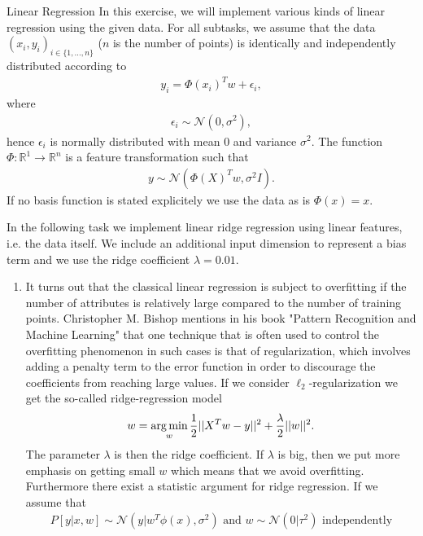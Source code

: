 \begin{task}{Linear Regression}
In this exercise, we will implement various kinds of linear regression using the given data. For all subtasks, we assume that the data $(x_i, y_i)_{i \in \{1, \hdots, n \}}$ ($n$ is the number of points) is identically and independently distributed according to 
\begin{align*}
y_i = \Phi(x_i)^T w + \epsilon_i,
\end{align*}
where
\begin{align*}
\epsilon_i  \sim \mathcal{N} ( 0, \sigma^2 ),
\end{align*}
hence $\epsilon_i$ is normally distributed with mean $0$ and variance $\sigma^2$. The function $\Phi : \mathbb{R}^1 \to \mathbb{R}^n$ is a feature transformation such that
\begin{align*}
y \sim \mathcal{N} ( \Phi(X)^T w, \sigma^2 I).
\end{align*}
If no basis function is stated explicitely we use the data as is $\Phi(x) = x$. 
\begin{subtask}
In the following task we implement linear ridge regression using linear features, i.e. the data itself. We include an additional input dimension to represent a bias term and we use the ridge coefficient $\lambda = 0.01$.
\begin{enumerate}
\item It turns out that the classical linear regression is subject to overfitting if the number of attributes is relatively large compared to the number of training points. Christopher M. Bishop mentions in his book "Pattern Recognition and Machine Learning" that one technique that is often used to control the overfitting phenomenon in such cases is that of regularization, which involves adding a penalty term to the error function in order to discourage the coefficients from reaching large values. If we consider $\ell_2$-regularization we get the so-called ridge-regression model
\begin{align*}
w = \operatorname*{arg\,min}_{w} \frac{1}{2} ||X^Tw - y||^2 + \frac{\lambda}{2} ||w||^2.
\end{align*}
The parameter $\lambda$ is then the ridge coefficient. If $\lambda$ is big, then we put more emphasis on getting small $w$ which means that we avoid overfitting. \\
Furthermore there exist a statistic argument for ridge regression. If we assume that 
\begin{align*}
P[y|x,w] \sim \mathcal{N}(y | w^T \phi(x), \sigma^2) \text{ and } w \sim \mathcal{N}(0 | \tau^2) \text{ independently}

\end{align*}
\end{enumerate}
\end{subtask}
\end{task}
